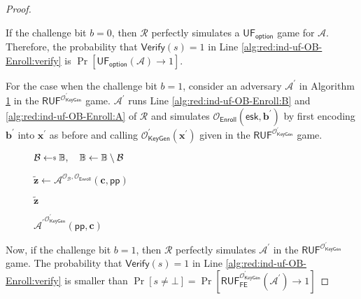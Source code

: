 \begin{proof}
\begin{figure}[h]
\end{figure}

	If the challenge bit $b = 0$, then $\mathcal{R}$ perfectly simulates a $\textsf{UF}_{\textsf{option}}$ game for $\mathcal{A}$. Therefore, the probability that $\textsf{Verify}(s) = 1$ in Line \ref{alg:red:ind-uf-OB-Enroll:verify} is $\Pr[\textsf{UF}_{\textsf{option}}(\mathcal{A}) \to 1]$.

	For the case when the challenge bit $b = 1$, consider an adversary $\mathcal{A}^\prime$ in Algorithm \ref{alg:adv:ind-uf-OB-Enroll} in the $\textsf{RUF}^{ \mathcal{O}^\prime_{\textsf{KeyGen}} }$ game. $\mathcal{A}^\prime$ runs Line \ref{alg:red:ind-uf-OB-Enroll:B} and \ref{alg:red:ind-uf-OB-Enroll:A} of $\mathcal{R}$ and simulates $\mathcal{O}_{\textsf{Enroll}}( \textsf{esk}, \mathbf{b}^\prime )$ by first encoding $\mathbf{b}^\prime$ into $\mathbf{x}^\prime$ as before and calling $\mathcal{O}_\textsf{KeyGen}^\prime(\mathbf{x}^\prime)$ given in the $\textsf{RUF}^{ \mathcal{O}^\prime_{\textsf{KeyGen}} }$ game. 


\begin{figure}[h]
\centering

	\begin{minipage}[t]{0.45\textwidth}
	\begin{algorithm}[H]
	\caption{${\mathcal{A}^\prime}^{\mathcal{O}^\prime_{\textsf{KeyGen}} }(\textsf{pp}, \mathbf{c})$}
	\label{alg:adv:ind-uf-OB-Enroll}
	\begin{algorithmic}[1]
		\State $\mathcal{B} \getsdollar \mathbb{B}, \quad \mathbb{B} \gets \mathbb{B} \setminus \mathcal{B}$ 
		
		\State $\mathbf{\tilde{z}} \gets {\mathcal{A}}^{\mathcal{O}_{\mathcal{B}}, \mathcal{O}_\textsf{Enroll} } (\mathbf{c}, \textsf{pp})$

		\State \Return $\mathbf{\tilde{z}}$
	\end{algorithmic}
	\end{algorithm}
	\end{minipage}

\end{figure}

Now, if the challenge bit $b = 1$, then $\mathcal{R}$ perfectly simulates $\mathcal{A}^\prime$ in the $\textsf{RUF}^{ \mathcal{O}^\prime_{\textsf{KeyGen}} }$ game. The probability that $\textsf{Verify}(s) = 1$ in Line \ref{alg:red:ind-uf-OB-Enroll:verify} is smaller than $\Pr[s \neq \bot] = \Pr[\textsf{RUF}^{\mathcal{O}^\prime_{\textsf{KeyGen}}}_{\textsf{FE}}(\mathcal{A}^\prime) \to 1 ]$


\end{proof}
